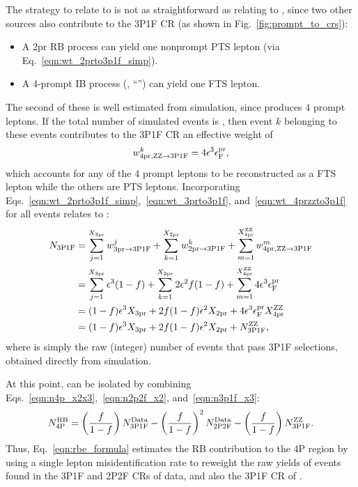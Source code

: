 The strategy to relate \xthreeprompt to \nthreePoneF is not as straightforward as relating \xtwoprompt to \ntwoPtwoF,
since two other sources also contribute to the 3P1F CR (as shown in Fig.~\ref{fig:prompt_to_crs}):
\begin{itemize}
	\item A 2pr RB process can yield one nonprompt PTS lepton (via Eq.~\ref{eqn:wt_2prto3p1f_simp}).
	\item A 4-prompt IB process (\qqggzzfourl, ``\ZZ'') can yield one FTS lepton.
\end{itemize}
The second of these is well estimated from simulation, since \ZZ produces 4 prompt leptons.
If the total number of simulated \ZZ events is \xfourpromptzz, then event $k$ belonging to these events contributes to the 3P1F CR an effective weight of
\begin{equation}
	\label{eqn:wt_4przzto3p1f}
	w_{\text{4pr},\mathrm{Z}\mathrm{Z} \to \text{3P1F}}^k = 4 \epsilon^3 \epsilon^\text{pr}_\text{F},
\end{equation}
which accounts for any of the 4 prompt leptons to be reconstructed as a FTS lepton while the others are PTS leptons.
Incorporating Eqs.~\ref{eqn:wt_2prto3p1f_simp},~\ref{eqn:wt_3prto3p1f}, and~\ref{eqn:wt_4przzto3p1f} for all events relates \xthreeprompt to \nthreePoneF:
\begin{align}
	\label{eqn:n3p1f_x3}
	N_{\text{3P1F}}
	&= \sum_{j=1}^{X_{3\text{pr}}} w_{\text{3pr} \to \text{3P1F}}^j + \sum_{k=1}^{X_{2\text{pr}}} w_{\text{2pr} \to \text{3P1F}}^k + \sum_{m=1}^{X_{4\text{pr}}^{\mathrm{Z}\mathrm{Z}}} w_{\text{4pr},\mathrm{Z}\mathrm{Z} \to \text{3P1F}}^m
	\notag
	\\
	&= \sum_{j=1}^{X_{3\text{pr}}} \epsilon^3 (1-f) + \sum_{k=1}^{X_{2\text{pr}}} 2 \epsilon^2 f (1-f) + \sum_{m=1}^{X_{4\text{pr}}^{\mathrm{Z}\mathrm{Z}}} 4 \epsilon^3 \epsilon^\text{pr}_\text{F}
	\notag
	\\
	&= (1-f) \epsilon^3 X_{3\text{pr}} + 2 f (1-f) \epsilon^2 X_{2\text{pr}} + 4 \epsilon^3 \epsilon^\text{pr}_\text{F} X_{4\text{pr}}^{\mathrm{Z}\mathrm{Z}}
	\notag
	\\
	&= (1-f) \epsilon^3 X_{3\text{pr}} + 2 f (1-f) \epsilon^2 X_{2\text{pr}} + N_{\text{3P1F}}^{\mathrm{Z}\mathrm{Z}},
\end{align}
where \nthreePoneFzz is simply the raw (integer) number of \ZZ events that pass 3P1F selections, obtained directly from simulation.

At this point, \nfourPRB can be isolated by combining Eqs.~\ref{eqn:n4p_x2x3},~\ref{eqn:n2p2f_x2}, and~\ref{eqn:n3p1f_x3}:
\begin{equation}
	\label{eqn:rbe_formula}
	N_\text{4P}^\text{RB} =
	\left( \frac{f}{1-f} \right) N_{\text{3P1F}}^{\text{Data}} -
	\left( \frac{f}{1-f} \right)^2 N_{\text{2P2F}}^{\text{Data}} - 
	\left( \frac{f}{1-f} \right) N_{\text{3P1F}}^{\mathrm{Z}\mathrm{Z}}.
\end{equation}
Thus, Eq.~\ref{eqn:rbe_formula} estimates the RB contribution to the 4P region by using a single lepton misidentification rate to reweight the raw yields of events found in the 3P1F and 2P2F CRs of data, and also the 3P1F CR of \ZZ.

